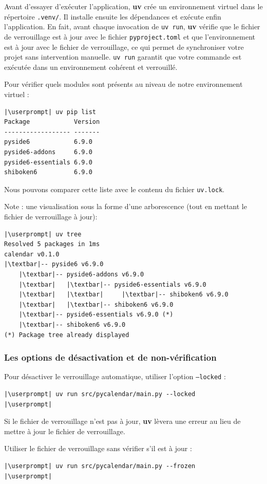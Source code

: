 Avant d'essayer d'exécuter l'application, \textbf{uv} crée un environnement virtuel dans le répertoire \texttt{.venv/}. Il installe ensuite les dépendances et exécute enfin l'application. En fait, avant chaque invocation de \texttt{uv run}, \textbf{uv} vérifie que le fichier de verrouillage est à jour avec le fichier \texttt{pyproject.toml} et que l'environnement est à jour avec le fichier de verrouillage, ce qui permet de synchroniser votre projet sans intervention manuelle. \texttt{uv run} garantit que votre commande est exécutée dans un environnement cohérent et verrouillé.

Pour vérifier quels modules sont présents au niveau de notre environnement virtuel :
\begin{lstlisting}[style=bash]
|\userprompt| uv pip list
Package            Version
------------------ -------
pyside6            6.9.0
pyside6-addons     6.9.0
pyside6-essentials 6.9.0
shiboken6          6.9.0
\end{lstlisting}

Nous pouvons comparer cette liste avec le contenu du fichier \texttt{uv.lock}.

Note : une visualisation sous la forme d'une arborescence (tout en mettant le fichier de verrouillage à jour):
\begin{lstlisting}[style=bash]
|\userprompt| uv tree
Resolved 5 packages in 1ms
calendar v0.1.0
|\textbar|-- pyside6 v6.9.0
    |\textbar|-- pyside6-addons v6.9.0
    |\textbar|   |\textbar|-- pyside6-essentials v6.9.0
    |\textbar|   |\textbar|     |\textbar|-- shiboken6 v6.9.0
    |\textbar|   |\textbar|-- shiboken6 v6.9.0
    |\textbar|-- pyside6-essentials v6.9.0 (*)
    |\textbar|-- shiboken6 v6.9.0
(*) Package tree already displayed
\end{lstlisting}

\subsubsection*{Les options de désactivation et de non-vérification}
Pour désactiver le verrouillage automatique, utiliser l'option \texttt{--locked} :
\begin{lstlisting}[style=bash]
|\userprompt| uv run src/pycalendar/main.py --locked
|\userprompt|
\end{lstlisting}

Si le fichier de verrouillage n'est pas à jour, \textbf{uv} lèvera une erreur au lieu de mettre à jour le fichier de verrouillage.

Utiliser le fichier de verrouillage sans vérifier s'il est à jour :
\begin{lstlisting}[style=bash]
|\userprompt| uv run src/pycalendar/main.py --frozen
|\userprompt|
\end{lstlisting}

